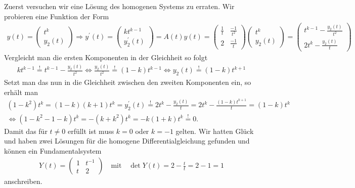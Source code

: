 \begin{solution}
    Zuerst versuchen wir eine Lösung des homogenen Systems zu erraten. Wir probieren eine Funktion der Form 
    \begin{align*}
        y(t) = \begin{pmatrix} t^k \\ y_2(t) \end{pmatrix} \Rightarrow y^\prime(t) = \begin{pmatrix} k t^{k - 1} \\ y_2^\prime(t) \end{pmatrix} = A(t) y(t) = 
        \begin{pmatrix}
            \frac{1}{t} & \frac{-1}{t^2} \\
            2 & \frac{-1}{t}
        \end{pmatrix} 
        \begin{pmatrix} t^k \\ y_2(t) \end{pmatrix} = \begin{pmatrix} t^{k - 1} - \frac{y_2(t)}{t^2} \\ 2t^k - \frac{y_2(t)}{t}\end{pmatrix}
    \end{align*}
    Vergleicht man die ersten Komponenten in der Gleichheit so folgt
    \begin{align*}
        k t^{k - 1} \stackrel{!}{=} t^{k - 1} - \frac{y_2(t)}{t^2}  \Leftrightarrow \frac{y_2(t)}{t^2} \stackrel{!}{=} (1 - k) t^{k - 1} \Leftrightarrow y_2(t) \stackrel{!}{=} (1 - k) t^{k + 1}
    \end{align*}
    Setzt man das nun in die Gleichheit zwischen den zweiten Komponenten ein, so erhält man 
    \begin{align*}
        (1 - k^2) t^k = (1 - k)(k + 1) t^k = y_2^\prime(t) \stackrel{!}{=} 2 t^k  - \frac{y_2(t)}{t} = 2 t^k - \frac{(1 - k) t^{k + 1}}{t} = (1 - k) t^k \\ 
        \Leftrightarrow (1 - k^2 - 1 - k) t^k = -(k + k^2) t^k = -k (1 + k) t^k \stackrel{!}{=} 0.
    \end{align*}
    Damit das für $t \neq 0$ erfüllt ist muss $k = 0$ oder $k = -1$ gelten. Wir hatten Glück und haben zwei Lösungen für die homogene Differentialgleichung gefunden und können ein Fundamentalsystem
    \begin{align*}
        Y(t) =
        \begin{pmatrix}
            1 & t^{-1} \\
            t & 2
        \end{pmatrix}
        \quad \textrm{mit} \quad \det Y(t) = 2 - \frac{t}{t} = 2 - 1 = 1
    \end{align*}
    anschreiben. 


\end{solution}
